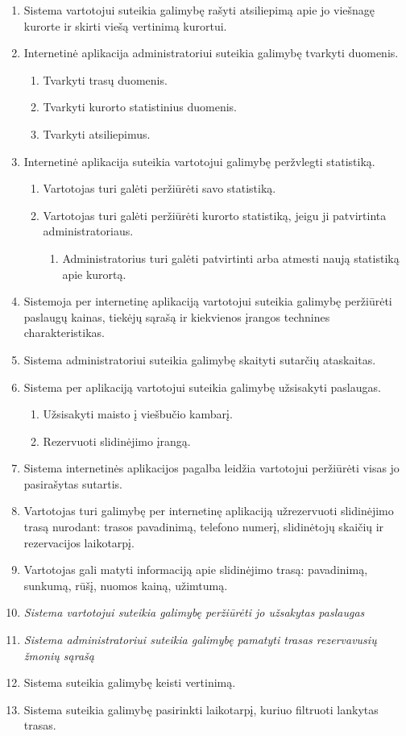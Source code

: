 \documentclass[oneside]{VUMIFPSkursinis}
\begin{document}
\begin{enumerate}
	\item Sistema vartotojui suteikia galimybę rašyti atsiliepimą apie jo viešnagę kurorte ir skirti viešą vertinimą kurortui.
	\item Internetinė aplikacija administratoriui suteikia galimybę tvarkyti duomenis.
	\begin{enumerate}
		\item Tvarkyti trasų duomenis.
		\item Tvarkyti kurorto statistinius duomenis.
		\item Tvarkyti atsiliepimus.
	\end{enumerate}
	\item Internetinė aplikacija suteikia vartotojui galimybę peržvlegti statistiką.
	\begin{enumerate}
		\item Vartotojas turi galėti peržiūrėti savo statistiką.
		\item Vartotojas turi galėti peržiūrėti kurorto statistiką, jeigu ji patvirtinta administratoriaus.
		\begin{enumerate}
			\item Administratorius turi galėti patvirtinti arba atmesti naują statistiką apie kurortą.
		\end{enumerate}
	\end{enumerate}
	\item Sistemoja per internetinę aplikaciją vartotojui suteikia galimybę peržiūrėti paslaugų kainas, tiekėjų sąrašą ir kiekvienos įrangos technines charakteristikas.
	\item Sistema administratoriui suteikia galimybę skaityti sutarčių ataskaitas.
	\item Sistema per aplikaciją vartotojui suteikia galimybę užsisakyti paslaugas.
	\begin{enumerate}
		\item Užsisakyti maisto į viešbučio kambarį.
		\item Rezervuoti slidinėjimo įrangą.
	\end{enumerate}
	\item Sistema internetinės aplikacijos pagalba leidžia vartotojui peržiūrėti visas jo pasirašytas sutartis.
	\item Vartotojas turi galimybę per internetinę aplikaciją užrezervuoti slidinėjimo trasą nurodant: trasos pavadinimą, telefono numerį, slidinėtojų skaičių ir rezervacijos laikotarpį.
	\item Vartotojas gali matyti informaciją apie slidinėjimo trasą: pavadinimą, sunkumą, rūšį, nuomos kainą, užimtumą.
	\item \textit{Sistema vartotojui suteikia galimybę peržiūrėti jo užsakytas paslaugas}
	\item \textit{Sistema administratoriui suteikia galimybę pamatyti trasas rezervavusių žmonių sąrašą}
	\item Sistema suteikia galimybę keisti vertinimą.
	\item Sistema suteikia galimybę pasirinkti laikotarpį, kuriuo filtruoti lankytas trasas.

\end{enumerate}
\end{document}
